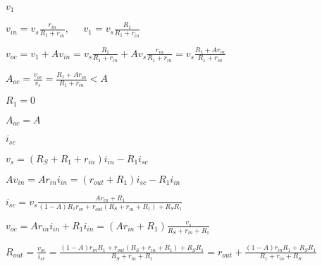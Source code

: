 \documentclass{article}
\def\lthtmlcheckvsize{\ifdim\ht\sizebox<\vsize 
  \ifdim\wd\sizebox<\hsize\expandafter\hfill\fi \expandafter\vfill
  \else\expandafter\vss\fi}%
\begin{document}
{\newpage\clearpage
{}%
$ v_1$%
\lthtmlindisplaymathZ
\lthtmlcheckvsize\clearpage}

{\newpage\clearpage
{}%
$\displaystyle v_{in}=v_s \frac{r_{in}}{R_1+r_{in}},\;\;\;\;\;
v_1=v_s \frac{R_1}{R_1+r_{in}}$%
\lthtmlindisplaymathZ
\lthtmlcheckvsize\clearpage}

{\newpage\clearpage
{}%
$\displaystyle v_{oc}=v_1+A v_{in}=v_s \frac{R_1}{R_1+r_{in}}+Av_s\frac{r_{in}}{R_1+r_{in}}
=v_s \frac{R_1+A r_{in}}{R_1+r_{in}}$%
\lthtmlindisplaymathZ
\lthtmlcheckvsize\clearpage}

{\newpage\clearpage
{}%
$\displaystyle A_{oc}=\frac{v_{oc}}{v_s}=\frac{R_1+A r_{in}}{R_1+r_{in}}<A$%
\lthtmlindisplaymathZ
\lthtmlcheckvsize\clearpage}

{\newpage\clearpage
{}%
$ R_1=0$%
\lthtmlindisplaymathZ
\lthtmlcheckvsize\clearpage}

{\newpage\clearpage
{}%
$ A_{oc}=A$%
\lthtmlindisplaymathZ
\lthtmlcheckvsize\clearpage}

{\newpage\clearpage
{}%
$ i_{sc}$%
\lthtmlindisplaymathZ
\lthtmlcheckvsize\clearpage}

{\newpage\clearpage
{}%
$\displaystyle v_s=(R_S+R_1+r_{in})i_{in}-R_1 i_{sc}$%
\lthtmlindisplaymathZ
\lthtmlcheckvsize\clearpage}

{\newpage\clearpage
{}%
$\displaystyle A v_{in}=A r_{in} i_{in}=(r_{out}+R_1) i_{sc}-R_1 i_{in}$%
\lthtmlindisplaymathZ
\lthtmlcheckvsize\clearpage}

{\newpage\clearpage
{}%
$\displaystyle i_{sc}=v_s \frac{Ar_{in}+R_1}{(1-A)R_1 r_{in} +r_{out}(R_S+r_{in}+R_1)+R_SR_1}$%
\lthtmlindisplaymathZ
\lthtmlcheckvsize\clearpage}

{\newpage\clearpage
{}%
$\displaystyle v_{oc}=Ar_{in}i_{in}+R_1i_{in}=(Ar_{in}+R_1)\frac{v_s}{R_S+r_{in}+R_1}$%
\lthtmlindisplaymathZ
\lthtmlcheckvsize\clearpage}

{\newpage\clearpage
{}%
$\displaystyle R_{out}=\frac{v_{oc}}{i_{sc}}
=\frac{(1-A)r_{in}R_1+r_{out}(R_S+r_{in}+R_1)+R_SR_1}{R_S+r_{in}+R_1}
=r_{out}+\frac{(1-A) r_{in}R_1 +R_SR_1}{R_1+r_{in}+R_S}$%
\lthtmlindisplaymathZ
\lthtmlcheckvsize\clearpage}
\end{document}
